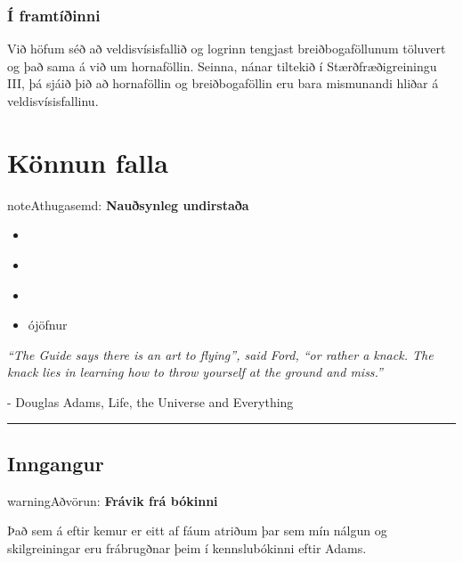 \documentclass[b5paper,11pt,icelandic]{sphinxmanual}
\begin{document}
\subsection{Í framtíðinni}
\label{kafli04:i-framtiinni}
Við höfum séð að veldisvísisfallið og logrinn tengjast breiðbogaföllunum
töluvert og það sama á við um hornaföllin. Seinna, nánar tiltekið í
Stærðfræðigreiningu III, þá sjáið þið að hornaföllin og breiðbogaföllin
eru bara mismunandi hliðar á veldisvísisfallinu.



\chapter{Könnun falla}
\label{kafli05:konnun-falla}\label{kafli05::doc}
\begin{notice}{note}{Athugasemd:}
\textbf{Nauðsynleg undirstaða}
\begin{itemize}
\item {} 
{\hyperref[kafli03:vaxandiminnkandi]{}}

\item {} 
{\hyperref[kafli03:afleidur]{}}

\item {} 
{\hyperref[kafli03:utgildi]{}}

\item {} 
ójöfnur

\end{itemize}
\end{notice}

\emph{``The Guide says there is an art to flying'', said Ford, ``or rather a knack.
The knack lies in learning how to throw yourself at the ground and miss.''}

- Douglas Adams, Life, the Universe and Everything


\bigskip\hrule{}\bigskip



\section{Inngangur}
\label{kafli05:inngangur}
\begin{notice}{warning}{Aðvörun:}
\textbf{Frávik frá bókinni}

Það sem á eftir kemur er eitt af fáum atriðum þar sem mín nálgun og
skilgreiningar eru frábrugðnar þeim í kennslubókinni eftir Adams.
\end{notice}
\end{document}
